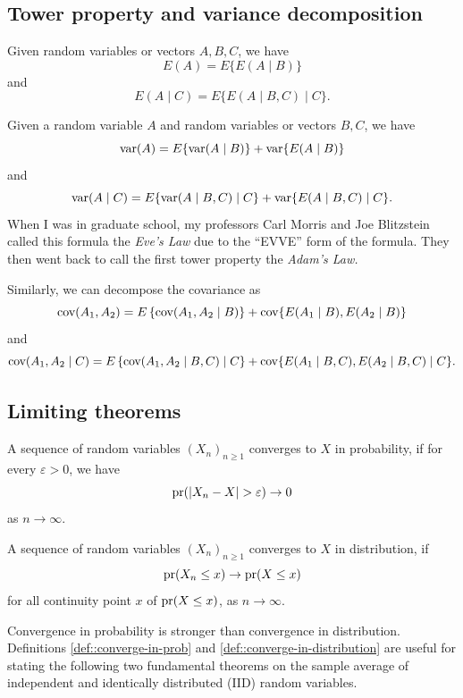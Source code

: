  



\subsection{Tower property and variance decomposition}\label{appendix::tower-property}

Given random variables or vectors $A, B, C$, we have
$$
E(A) = E\{   E(A \mid B) \} 
$$
and
$$
E(A\mid C) = E\{   E(A \mid B, C) \mid C \}. 
$$

 
Given a random variable $A$ and random variables or vectors $B, C$, we have
$$
\textup{var}(A) = E\{   \textup{var}(A \mid B) \}  +  \textup{var}\{   E(A \mid B) \} 
$$
and
$$
\textup{var}(A\mid C) = E\{   \textup{var}(A \mid B, C)  \mid C \}  +  \textup{var}\{   E(A \mid B, C)\mid C \}  .
$$
When I was in graduate school, my professors Carl Morris and Joe Blitzstein called this formula the {\it Eve's Law} due to the ``EVVE'' form of the formula. They then went back to call the first tower property the {\it Adam's Law.}



Similarly, we can decompose the covariance as
$$
\textup{cov}(A_1, A_2) = E\left\{ \textup{cov}(A_1, A_2\mid B)   \right\} + \textup{cov}\{ E(A_1\mid B), E(A_2\mid B)  \}
$$
and
$$
\textup{cov}(A_1, A_2\mid C) = E\left\{ \textup{cov}(A_1, A_2\mid B, C)  \mid C \right\} + \textup{cov}\{ E(A_1\mid B, C), E(A_2\mid B, C) \mid C  \}.
$$


\subsection{Limiting theorems}


\begin{definition}
\label{def::converge-in-prob}
A sequence of random variables $(X_n)_{n\geq 1}$ converges to $X$ in probability, if for every $\varepsilon > 0$, we have
$$
\textup{pr} (   |X_n - X| > \varepsilon  ) \rightarrow 0
$$
as $n\rightarrow \infty$. 
\end{definition}



\begin{definition}
\label{def::converge-in-distribution}
A sequence of random variables $(X_n)_{n\geq 1}$ converges to $X$ in distribution, if 
$$
\textup{pr}(X_n \leq x) \rightarrow \textup{pr}(X\leq x)
$$
for all continuity point $x$ of $ \textup{pr}(X\leq x) $, as $n\rightarrow \infty$. 
\end{definition}


Convergence in probability is stronger than convergence in distribution. Definitions \ref{def::converge-in-prob} and \ref{def::converge-in-distribution} are useful for stating the following two fundamental theorems on the sample average of independent and identically distributed (IID) random variables. 



